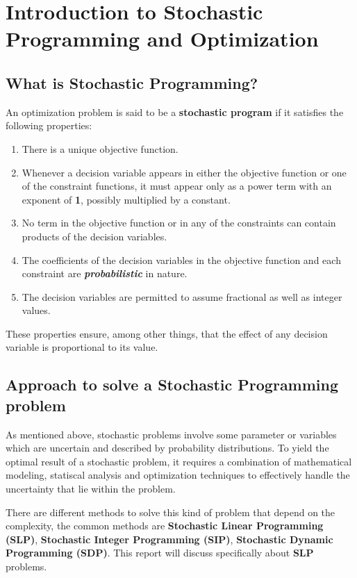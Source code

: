 \newpage
\section{Introduction to Stochastic Programming and Optimization}
	\subsection{What is Stochastic Programming?}
	An optimization problem is said to be a \textbf{stochastic program} if it satisfies the following
properties:

\begin{enumerate}
	\item There is a unique objective function.
	\item Whenever a decision variable appears in either the objective function or one of the constraint functions, it must appear only as a power term with an exponent of \textbf{1}, possibly multiplied by a constant.
	\item No term in the objective function or in any of the constraints can contain products of the
	decision variables.
	\item The coefficients of the decision variables in the objective function and each constraint
	are \textit{\textbf{probabilistic}}  in nature.
	\item The decision variables are permitted to assume fractional as well as integer values.

\end{enumerate}

These properties ensure, among other things, that the effect of any decision variable is proportional to its value.
	
	\subsection{Approach to solve a Stochastic Programming problem}

	\qquad As mentioned above, stochastic problems involve some parameter or variables which are uncertain and described by probability distributions. 
	To yield the optimal result of a stochastic problem, it requires a combination of mathematical modeling, statiscal analysis
	and optimization techniques to effectively handle the uncertainty that lie within the problem.

	\qquad There are different methods to solve this kind of problem that depend on the complexity, the common methods are \textbf{Stochastic Linear Programming (SLP)}, \textbf{Stochastic Integer Programming (SIP)}, \textbf{Stochastic Dynamic Programming (SDP)}.
	This report will discuss specifically about \textbf{SLP} problems.                                                                                                                                                                                                                                                                                                                                                                                                                                                                                                                                                             